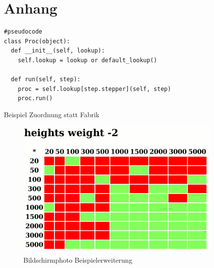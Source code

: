 \appendix
\chapter{Anhang}

\begin{listing}[h]
\centering
\begin{verbatim}
#pseudocode
class Proc(object):
  def __init__(self, lookup):
    self.lookup = lookup or default_lookup()

  def run(self, step):
    proc = self.lookup[step.stepper](self, step)
    proc.run()
\end{verbatim}
\caption{Beispiel Zuordnung statt Fabrik}
\label{fig:fabrik-mapping}
\end{listing}


\begin{figure}
    \centering
    \includegraphics[width=4in]{images/exemplar-ausgabe.png}
    \caption{Bildschirmphoto Beispielerweiterung}
    \label{fig:beispielerweiterung-screenshoot}
\end{figure}

